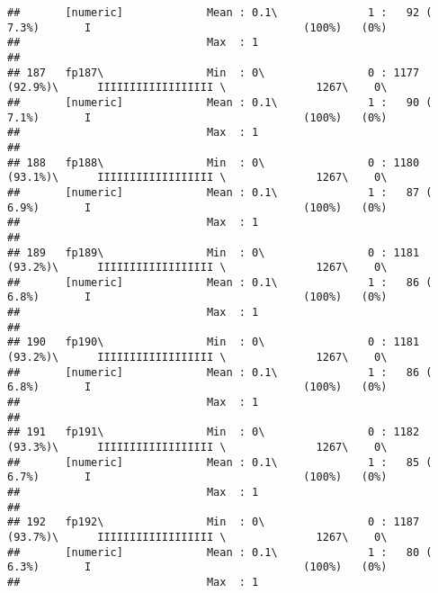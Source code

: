 \documentclass[]{article}
\begin{document}
\begin{verbatim}
##       [numeric]             Mean : 0.1\              1 :   92 ( 7.3%)       I                                 (100%)   (0%)     
##                             Max  : 1                                                                                            
## 
## 187   fp187\                Min  : 0\                0 : 1177 (92.9%)\      IIIIIIIIIIIIIIIIII \              1267\    0\       
##       [numeric]             Mean : 0.1\              1 :   90 ( 7.1%)       I                                 (100%)   (0%)     
##                             Max  : 1                                                                                            
## 
## 188   fp188\                Min  : 0\                0 : 1180 (93.1%)\      IIIIIIIIIIIIIIIIII \              1267\    0\       
##       [numeric]             Mean : 0.1\              1 :   87 ( 6.9%)       I                                 (100%)   (0%)     
##                             Max  : 1                                                                                            
## 
## 189   fp189\                Min  : 0\                0 : 1181 (93.2%)\      IIIIIIIIIIIIIIIIII \              1267\    0\       
##       [numeric]             Mean : 0.1\              1 :   86 ( 6.8%)       I                                 (100%)   (0%)     
##                             Max  : 1                                                                                            
## 
## 190   fp190\                Min  : 0\                0 : 1181 (93.2%)\      IIIIIIIIIIIIIIIIII \              1267\    0\       
##       [numeric]             Mean : 0.1\              1 :   86 ( 6.8%)       I                                 (100%)   (0%)     
##                             Max  : 1                                                                                            
## 
## 191   fp191\                Min  : 0\                0 : 1182 (93.3%)\      IIIIIIIIIIIIIIIIII \              1267\    0\       
##       [numeric]             Mean : 0.1\              1 :   85 ( 6.7%)       I                                 (100%)   (0%)     
##                             Max  : 1                                                                                            
## 
## 192   fp192\                Min  : 0\                0 : 1187 (93.7%)\      IIIIIIIIIIIIIIIIII \              1267\    0\       
##       [numeric]             Mean : 0.1\              1 :   80 ( 6.3%)       I                                 (100%)   (0%)     
##                             Max  : 1                                                                                            

\end{verbatim}
\end{document}

